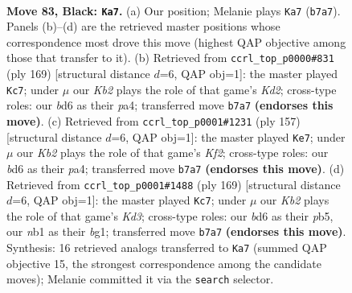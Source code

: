 \documentclass[11pt]{article}
\begin{document}
\clearpage

\begin{figure}[p]\centering
\begin{subfigure}{0.46\textwidth}\centering
\resizebox{\linewidth}{!}{%
\newchessgame
\chessboard[
  setfen={8/1k6/3B4/8/p1p3b1/8/5K2/1N6 b - - 21 83},
  showmover=false,
  pgfstyle=straightmove, color=movearrow, markmove={b7-a7}
]}
\caption{}
\end{subfigure}\hfill
\begin{subfigure}{0.46\textwidth}\centering
\resizebox{\linewidth}{!}{%
\newchessgame
\chessboard[
  setfen={8/3k4/8/p1K5/P7/8/2N1p3/8 b - - 37 85},
  showmover=false,
  pgfstyle=straightmove, color=movearrow, markmove={d7-c7}
]}
\caption{}
\end{subfigure}
\\[4pt]
\begin{subfigure}{0.46\textwidth}\centering
\resizebox{\linewidth}{!}{%
\newchessgame
\chessboard[
  setfen={8/5k2/8/p4K2/P7/3N4/4p3/8 b - - 3 79},
  showmover=false,
  pgfstyle=straightmove, color=movearrow, markmove={f7-e7}
]}
\caption{}
\end{subfigure}\hfill
\begin{subfigure}{0.46\textwidth}\centering
\resizebox{\linewidth}{!}{%
\newchessgame
\chessboard[
  setfen={8/8/3k4/1P5b/5p2/8/3K4/6B1 b - - 9 85},
  showmover=false,
  pgfstyle=straightmove, color=movearrow, markmove={d6-c7}
]}
\caption{}
\end{subfigure}
\caption{\textbf{Move 83, Black: \texttt{Ka7}.} (a) Our position; Melanie plays \texttt{Ka7} (\texttt{b7a7}). Panels (b)--(d) are the retrieved master positions whose correspondence most drove this move (highest QAP objective among those that transfer to it). (b) Retrieved from \texttt{ccrl\_top\_p0000\#831} (ply 169) [structural distance $d$=6, QAP obj=1]: the master played \texttt{Kc7}; under $\mu$ our \emph{Kb2} plays the role of that game's \emph{Kd2}; cross-type roles: our \emph{b}d6 as their \emph{p}a4; transferred move \texttt{b7a7} \textbf{(endorses this move)}. (c) Retrieved from \texttt{ccrl\_top\_p0001\#1231} (ply 157) [structural distance $d$=6, QAP obj=1]: the master played \texttt{Ke7}; under $\mu$ our \emph{Kb2} plays the role of that game's \emph{Kf2}; cross-type roles: our \emph{b}d6 as their \emph{p}a4; transferred move \texttt{b7a7} \textbf{(endorses this move)}. (d) Retrieved from \texttt{ccrl\_top\_p0001\#1488} (ply 169) [structural distance $d$=6, QAP obj=1]: the master played \texttt{Kc7}; under $\mu$ our \emph{Kb2} plays the role of that game's \emph{Kd3}; cross-type roles: our \emph{b}d6 as their \emph{p}b5, our \emph{n}b1 as their \emph{b}g1; transferred move \texttt{b7a7} \textbf{(endorses this move)}. Synthesis: 16 retrieved analogs transferred to \texttt{Ka7} (summed QAP objective 15, the strongest correspondence among the candidate moves); Melanie committed it via the \texttt{search} selector.}
\label{fig:thought-m165}
\end{figure}
\end{document}
